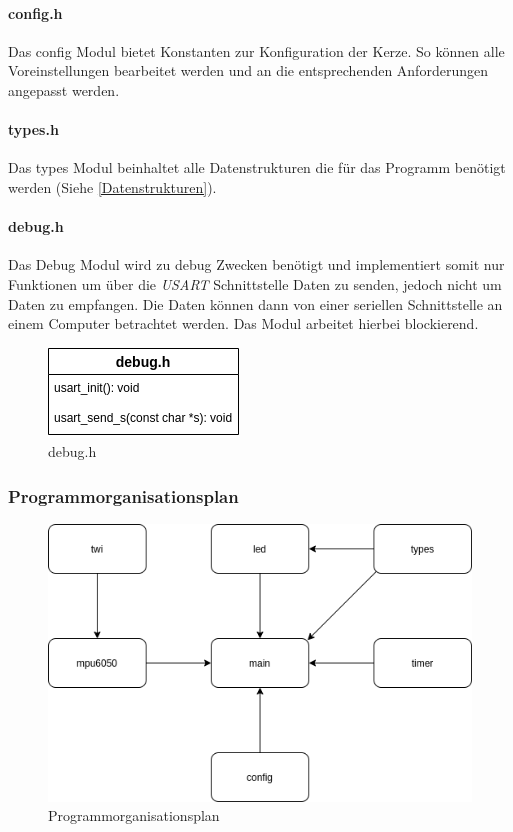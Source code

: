         \paragraph{config.h}
            Das config Modul bietet Konstanten zur Konfiguration der Kerze.
            So können alle Voreinstellungen bearbeitet werden und an die
            entsprechenden Anforderungen angepasst werden.

        \paragraph{types.h}
            Das types Modul beinhaltet alle Datenstrukturen die für das Programm 
            benötigt werden (Siehe \ref{Datenstrukturen}).

        \paragraph{debug.h}
            Das Debug Modul wird zu debug Zwecken benötigt und implementiert
            somit nur Funktionen um über die \textit{USART} Schnittstelle Daten zu
            senden, jedoch nicht um Daten zu empfangen. Die Daten können dann von einer
            seriellen Schnittstelle an einem Computer betrachtet werden.
            Das Modul arbeitet hierbei blockierend.

            \begin{figure}[H]
                \centering
                \includegraphics[scale=0.6]{img/debug.png}
                \caption{debug.h}
            \end{figure}
    
    \subsubsection{Programmorganisationsplan}
        \begin{figure}[H]
            \centering
            \includegraphics[scale=0.5]{img/pop.png}
            \caption{Programmorganisationsplan}
        \end{figure}

